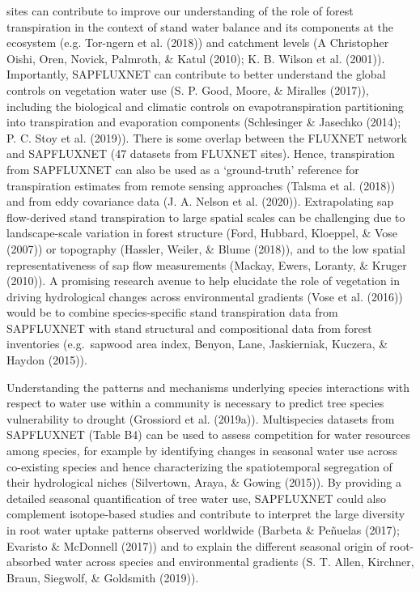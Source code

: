 \documentclass[11pt,twoside]{reedthesis}
\begin{document}
sites can contribute to improve our understanding of the role of forest
transpiration in the context of stand water balance and its components
at the ecosystem (e.g. Tor-ngern et al. (2018)) and catchment levels (A
Christopher Oishi, Oren, Novick, Palmroth, \& Katul (2010); K. B. Wilson
et al. (2001)). Importantly, SAPFLUXNET can contribute to better
understand the global controls on vegetation water use (S. P. Good,
Moore, \& Miralles (2017)), including the biological and climatic
controls on evapotranspiration partitioning into transpiration and
evaporation components (Schlesinger \& Jasechko (2014); P. C. Stoy et
al. (2019)). There is some overlap between the FLUXNET network and
SAPFLUXNET (47 datasets from FLUXNET sites). Hence, transpiration from
SAPFLUXNET can also be used as a `ground-truth' reference for
transpiration estimates from remote sensing approaches (Talsma et al.
(2018)) and from eddy covariance data (J. A. Nelson et al. (2020)).
Extrapolating sap flow-derived stand transpiration to large spatial
scales can be challenging due to landscape-scale variation in forest
structure (Ford, Hubbard, Kloeppel, \& Vose (2007)) or topography
(Hassler, Weiler, \& Blume (2018)), and to the low spatial
representativeness of sap flow measurements (Mackay, Ewers, Loranty, \&
Kruger (2010)). A promising research avenue to help elucidate the role
of vegetation in driving hydrological changes across environmental
gradients (Vose et al. (2016)) would be to combine species-specific
stand transpiration data from SAPFLUXNET with stand structural and
compositional data from forest inventories (e.g.~sapwood area index,
Benyon, Lane, Jaskierniak, Kuczera, \& Haydon (2015)).\par

Understanding the patterns and mechanisms underlying species
interactions with respect to water use within a community is necessary
to predict tree species vulnerability to drought (Grossiord et al.
(2019a)). Multispecies datasets from SAPFLUXNET (Table B4) can be used
to assess competition for water resources among species, for example by
identifying changes in seasonal water use across co-existing species and
hence characterizing the spatiotemporal segregation of their
hydrological niches (Silvertown, Araya, \& Gowing (2015)). By providing
a detailed seasonal quantification of tree water use, SAPFLUXNET could
also complement isotope-based studies and contribute to interpret the
large diversity in root water uptake patterns observed worldwide
(Barbeta \& Peñuelas (2017); Evaristo \& McDonnell (2017)) and to
explain the different seasonal origin of root-absorbed water across
species and environmental gradients (S. T. Allen, Kirchner, Braun,
Siegwolf, \& Goldsmith (2019)).\par
\end{document}
